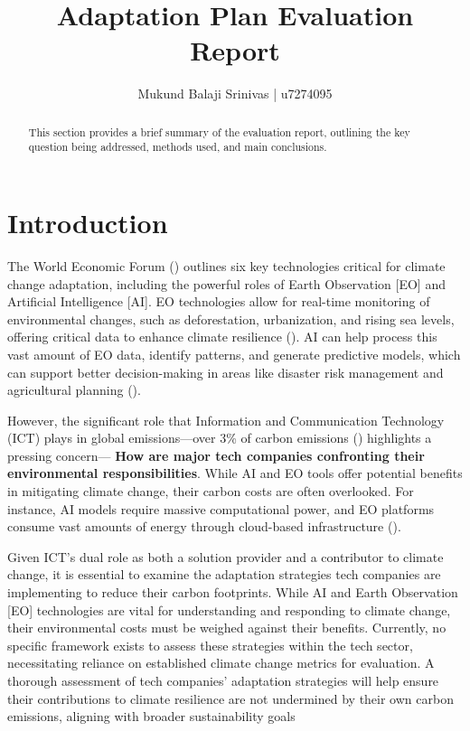 \documentclass[12pt]{article}
\title{Adaptation Plan Evaluation Report}
\author{Mukund Balaji Srinivas | u7274095}
\date{} %
\begin{document}
\maketitle

\begin{abstract}
This section provides a brief summary of the evaluation report, outlining the key question being addressed, methods used, and main conclusions.
\end{abstract}

\newpage

\section*{Introduction}
The World Economic Forum (\cite{masterson_2024})  outlines six key technologies critical for climate change adaptation, including the powerful roles of Earth Observation [EO] and Artificial Intelligence [AI]. EO technologies allow for real-time monitoring of environmental changes, such as deforestation, urbanization, and rising sea levels, offering critical data to enhance climate resilience (\cite{anderson_2017}). AI can help process this vast amount of EO data, identify patterns, and generate predictive models, which can support better decision-making in areas like disaster risk management and agricultural planning (\cite{Huntingford_2019}).

However, the significant role that Information and Communication Technology (ICT) plays in global emissions—over 3\% of carbon emissions (\cite{jones_2018}) highlights a pressing concern— \textbf{How are major tech companies confronting their environmental responsibilities}. While AI and EO tools offer potential benefits in mitigating climate change, their carbon costs are often overlooked. For instance, AI models require massive computational power, and EO platforms consume vast amounts of energy through cloud-based infrastructure (\cite{taddeo_2021}).

Given ICT's dual role as both a solution provider and a contributor to climate change, it is essential to examine the adaptation strategies tech companies are implementing to reduce their carbon footprints. While AI and Earth Observation [EO] technologies are vital for understanding and responding to climate change, their environmental costs must be weighed against their benefits. Currently, no specific framework exists to assess these strategies within the tech sector, necessitating reliance on established climate change metrics for evaluation. A thorough assessment of tech companies' adaptation strategies will help ensure their contributions to climate resilience are not undermined by their own carbon emissions, aligning with broader sustainability goals
\end{document}
